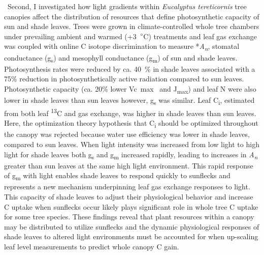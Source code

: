 \documentclass[a4paper]{article}
\begin{document}
\
Second, I investigated how light gradients within \textit{Eucalyptus tereticornis} tree canopies affect the distribution of resources that define photosynthetic capacity of sun and shade leaves. Trees were grown in climate-controlled  whole tree chambers under prevailing ambient and warmed (+3~$\degree$C) treatments and leaf gas exchange was coupled with online C isotope discrimination to measure *\textit{A\textsubscript{n}}, stomatal conductance (g\textsubscript{s}) and mesophyll conductance (g\textsubscript{m}) of sun and shade leaves. Photosynthesis rates were reduced by ca. 40~\% in shade leaves associated with a 75\% reduction in photosynthetically active radiation compared to sun leaves. Photosynthetic capacity (ca. 20\% lower Vc~max~ and J\textsubscript{max}) and leaf N were also lower in shade leaves than sun leaves however, g\textsubscript{s} was similar. Leaf C\textsubscript{i}, estimated from both leaf {\textdelta}\textsuperscript{13}C and gas exchange, was higher in shade leaves than sun leaves. Here, the optimization theory hypothesis that C\textsubscript{i} should be optimized throughout the canopy was rejected because water use efficiency was lower in shade leaves, compared to sun leaves. When light intensity was increased from low light to high light for shade leaves both g\textsubscript{s} and g\textsubscript{m} increased rapidly, leading to increases in \textit{A\textsubscript{n}} greater than sun leaves at the same high light environment. This rapid response of g\textsubscript{m} with light enables shade leaves to respond quickly to sunflecks and represents a new mechanism underpinning leaf gas exchange responses to light. This capacity of shade leaves to adjust their physiological behavior and increase C uptake when sunflecks occur likely plays significant role in whole tree C uptake for some tree species. These findings reveal that plant resources within a canopy may be distributed to utilize sunflecks and the dynamic physiological responses of shade leaves to altered light environments must be accounted for when up-scaling leaf level measurements to predict whole canopy C gain. 
\end{document}
